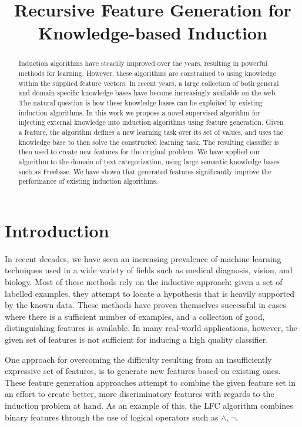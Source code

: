 \documentclass{article}
\title{Recursive Feature Generation for Knowledge-based Induction}
\theoremstyle{definition}
\begin{document}
	
\maketitle
	
\begin{abstract}
	Induction algorithms have steadily improved over the years, resulting in powerful methods for learning. However, these algorithms are constrained to using knowledge within the supplied feature vectors. In recent years, a large collection of both general and domain-specific knowledge bases have become increasingly available on the web. The natural question is how these knowledge bases can be exploited by existing induction algorithms.
	In this work we propose a novel supervised algorithm for injecting external knowledge into induction algorithms using feature generation. Given a feature, the algorithm defines a new learning task over its set of values, and uses the knowledge base to then solve the constructed learning task. The resulting classifier is then used to create new features for the original problem.
	We have applied our algorithm to the domain of text categorization, using large semantic knowledge bases such as Freebase. We have shown that generated features significantly improve the performance of existing induction algorithms.
\end{abstract}

\section{Introduction}
\label{sec:Intro}
In recent decades, we have seen an increasing prevalence of machine learning techniques used in a wide variety of fields such as medical diagnosis, vision, and biology.
Most of these methods rely on the inductive approach: given a set of labelled examples, they attempt to locate a hypothesis that is heavily supported by the known data. These methods have proven themselves successful in cases where there is a sufficient number of examples, and a collection of good,
distinguishing features is available.
In many real-world applications, however, the given set of features is not sufficient for inducing a high quality classifier.

One approach for overcoming the difficulty resulting from an insufficiently expressive set of features, is to generate new features based on existing ones. 
These feature generation approaches attempt to combine the given feature set in an effort to create better, more discriminatory features with regards to the induction problem at hand. As an example of this, the LFC algorithm \citep{ragavan1993complex} combines binary features through the use of logical operators such as $\land ,\lnot$.
\end{document}
